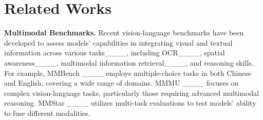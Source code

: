 \section{Related Works}
\noindent\textbf{Multimodal Benchmarks.}
Recent vision-language benchmarks have been developed to assess models' capabilities in integrating visual and textual information across various tasks____, including OCR____, spatial awareness____, multimodal information retrieval____, and reasoning skills.
For example, MMBench ____ employs multiple-choice tasks in both Chinese and English, covering a wide range of domains.
MMMU ____ focuses on complex vision-language tasks, particularly those requiring advanced multimodal reasoning.
MMStar ____ utilizes multi-task evaluations to test models' ability to fuse different modalities.

